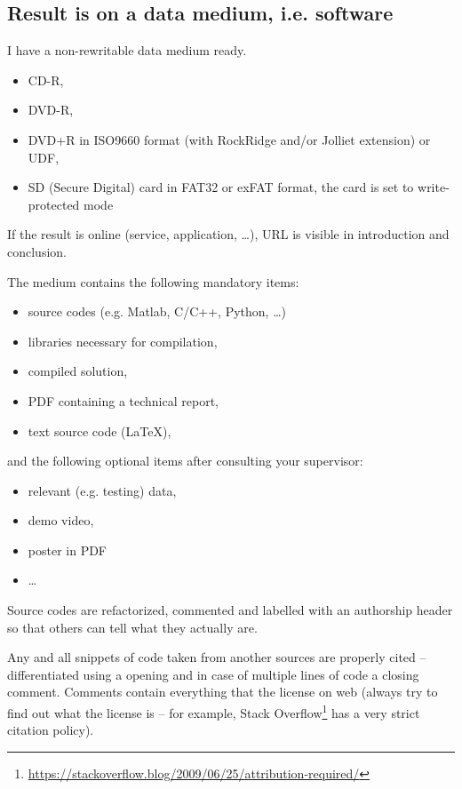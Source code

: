 \subsection*{Result is on a data medium, i.e. software}
\begin{checklist}
	\item I have a non-rewritable data medium ready.
    \begin{itemize}
    	\item CD-R,
        \item DVD-R,
        \item DVD+R in ISO9660 format (with RockRidge and/or Jolliet extension) or UDF,
        \item SD (Secure Digital) card in FAT32 or exFAT format, the card is set to write-protected mode
    \end{itemize}
    \item If the result is online (service, application, …), URL is visible in introduction and conclusion.
    \item The medium contains the following mandatory items:
    \begin{itemize}
    	\item source codes (e.g. Matlab, C/C++, Python, \ldots)
        \item libraries necessary for compilation,
        \item compiled solution,
        \item PDF containing a technical report,
        \item text source code (\LaTeX{}),
    \end{itemize}
    and the following optional items after consulting your supervisor:
    \begin{itemize}
    	\item relevant (e.g. testing) data,
        \item demo video,
        \item poster in PDF
        \item \ldots
    \end{itemize}
    \item Source codes are refactorized, commented and labelled with an authorship header so that others can tell what they actually are.
    \item Any and all snippets of code taken from another sources are properly cited -- differentiated using a opening and in case of multiple lines of code a closing comment. Comments contain everything that the license on web (always try to find out what the license is -- for example, Stack Overflow\footnote{\url{https://stackoverflow.blog/2009/06/25/attribution-required/}} has a very strict citation policy).
\end{checklist}

